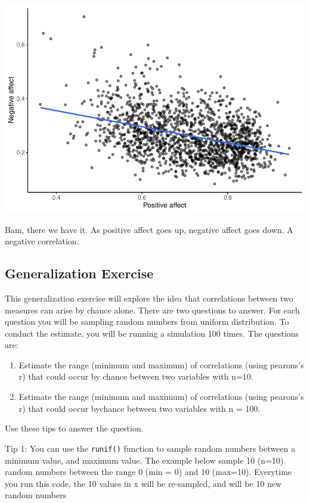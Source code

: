 \documentclass[
]{book}
\begin{document}
\includegraphics{Statistics_Lab_files/figure-latex/unnamed-chunk-291-1.pdf}

Bam, there we have it. As positive affect goes up, negative affect goes down. A negative correlation.

\hypertarget{generalization-exercise-4}{%
\subsection{Generalization Exercise}\label{generalization-exercise-4}}

This generalization exercise will explore the idea that correlations between two measures can arise by chance alone. There are two questions to answer. For each question you will be sampling random numbers from uniform distribution. To conduct the estimate, you will be running a simulation 100 times. The questions are:

\begin{enumerate}
\def\labelenumi{\arabic{enumi}.}
\item
  Estimate the range (minimum and maximum) of correlations (using pearons's r) that could occur by chance between two variables with n=10.
\item
  Estimate the range (minimum and maximum) of correlations (using pearons's r) that could occur bychance between two variables with n = 100.
\end{enumerate}

Use these tips to answer the question.

Tip 1: You can use the \texttt{runif()} function to sample random numbers between a minimum value, and maximum value. The example below sample 10 (n=10) random numbers between the range 0 (min = 0) and 10 (max=10). Everytime you run this code, the 10 values in x will be re-sampled, and will be 10 new random numbers
\end{document}
